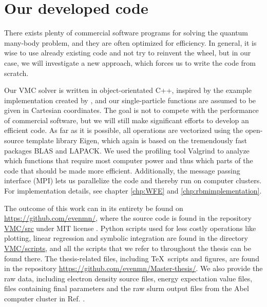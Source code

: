 \section{Our developed code}
There exists plenty of commercial software programs for solving the quantum many-body problem, and they are often optimized for efficiency. In general, it is wise to use already existing code and not try to reinvent the wheel, but in our case, we will investigate a new approach, which forces us to write the code from scratch. 

Our VMC solver is written in object-orientated C++, inspired by the example implementation created by \citet{ledum_simple_2016}, and our single-particle functions are assumed to be given in Cartesian coordinates. The goal is not to compete with the performance of commercial software, but we will still make significant efforts to develop an efficient code. As far as it is possible, all operations are vectorized using the open-source template library Eigen, which again is based on the tremendously fast packages BLAS and LAPACK. We used the profiling tool Valgrind to analyze which functions that require most computer power and thus which parts of the code that should be made more efficient. Additionally, the message passing interface (MPI) lets us parallelize the code and thereby run on computer clusters. For implementation details, see chapter \ref{chp:WFE} and \ref{chp:rbmimplementation}. 

The outcome of this work can in its entirety be found on \url{https://github.com/evenmn/}, where the source code is found in the repository \href{https://github.com/evenmn/VMC/tree/master/src}{VMC/src} under MIT license \cite{noauthor_mit_nodate}. Python scripts used for less costly operations like plotting, linear regression and symbolic integration are found in the directory \href{https://github.com/evenmn/VMC/tree/master/scripts}{VMC/scripts}, and all the scripts that we refer to throughout the thesis can be found there. The thesis-related files, including \TeX\, scripts and figures, are found in the repository \url{https://github.com/evenmn/Master-thesis/}. We also provide the raw data, including electron density source files, energy expectation value files, files containing final parameters and the raw slurm output files from the Abel computer cluster in Ref. \cite{nordhagen_even_marius_2019_3477946}.

